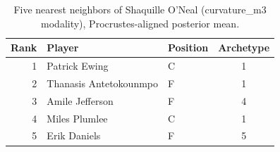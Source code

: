 \begin{table}[htbp]
  \centering\small
  \begin{tabular}{rllc}
    \toprule
    Rank & Player & Position & Archetype \\
    \midrule
    1 & Patrick Ewing & C & 1 \\
    2 & Thanasis Antetokounmpo & F & 1 \\
    3 & Amile Jefferson & F & 4 \\
    4 & Miles Plumlee & C & 1 \\
    5 & Erik Daniels & F & 5 \\
    \bottomrule
  \end{tabular}
  \caption{Five nearest neighbors of Shaquille O'Neal (curvature_m3 modality), Procrustes-aligned posterior mean.}
  \label{tab:Shaquille_O_Neal_neighbors_curvature_m3}
\end{table}

